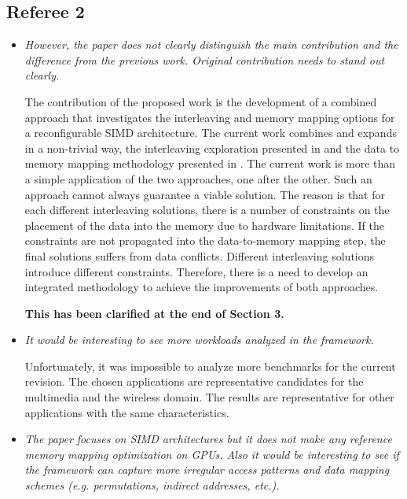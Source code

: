 \documentclass[12pt,a4paper,notitlepage]{article}
\begin{document}
\subsection*{Referee 2}

\begin{itemize}

\item \textit{However, the paper does not clearly distinguish the main contribution and 
the difference from the previous work. Original contribution needs to stand
out clearly.}

The contribution of the proposed work is the development of a combined approach that investigates the interleaving and memory mapping options for a reconfigurable SIMD architecture.  
The current work combines and expands in a non-trivial way, the interleaving exploration presented in \cite{sharma2013data} and the data to memory mapping methodology presented in \cite{filippopoulos2013exploration}. 
The current work is more than a simple application of the two approaches, one after the other.
Such an approach cannot always guarantee a viable solution.
The reason is that for each different interleaving solutions, there is a number of constraints on the placement of the data into the memory due to hardware limitations.
If the constraints are not propagated into the data-to-memory mapping step, the final solutions suffers from data conflicts.
Different interleaving solutions introduce different constraints. 
Therefore, there is a need to develop an integrated methodology to achieve the improvements of both approaches.

\textbf{This has been clarified at the end of Section 3.}

\item \textit{It would be interesting to see more workloads analyzed in the framework.}

Unfortunately, it was impossible to analyze more benchmarks for the current revision. 
The chosen applications are representative candidates for the multimedia and the wireless domain.
The results are representative for other applications with the same characteristics.

\item \textit{The paper focuses on SIMD architectures but it does not make any reference memory mapping optimization on GPUs. Also it would be interesting to
see if the framework can capture more irregular access patterns and data mapping schemes (e.g. permutations, indirect addresses, etc.). }


\end{itemize}
\end{document}
